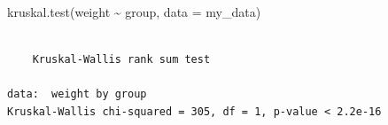 \documentclass[
  letterpaper,
  DIV=11,
  numbers=noendperiod]{scrartcl}
\newenvironment{Shaded}{\begin{snugshade}}{\end{snugshade}}
\newcommand{\AttributeTok}[1]{\textcolor[rgb]{0.40,0.45,0.13}{#1}}
\newcommand{\FunctionTok}[1]{\textcolor[rgb]{0.28,0.35,0.67}{#1}}
\newcommand{\NormalTok}[1]{\textcolor[rgb]{0.00,0.23,0.31}{#1}}
\newcommand{\SpecialCharTok}[1]{\textcolor[rgb]{0.37,0.37,0.37}{#1}}
\begin{document}
\begin{Shaded}
\begin{Highlighting}[]
\FunctionTok{kruskal.test}\NormalTok{(weight }\SpecialCharTok{\textasciitilde{}}\NormalTok{ group, }\AttributeTok{data =}\NormalTok{ my\_data)}
\end{Highlighting}
\end{Shaded}

\begin{verbatim}

    Kruskal-Wallis rank sum test

data:  weight by group
Kruskal-Wallis chi-squared = 305, df = 1, p-value < 2.2e-16
\end{verbatim}
\end{document}
